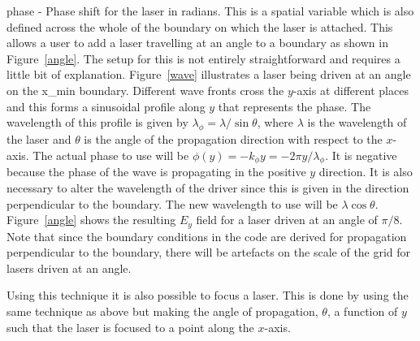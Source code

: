 {\emphtext phase} - Phase shift for the laser in radians. This is a spatial
variable which is also defined across the whole of the boundary on which the
laser is attached. This allows a user to add a laser travelling at an angle
to a boundary as shown in Figure~\ref{angle}.
The setup for this is not entirely straightforward and requires a little
bit of explanation. Figure~\ref{wave} illustrates a laser being driven at
an angle on the x\_min boundary. Different wave fronts cross the $y$-axis
at different places and this forms a sinusoidal profile along $y$ that
represents the phase. The wavelength of this profile is
given by $\lambda_\phi = \lambda / \sin\theta$, where $\lambda$ is the
wavelength of the laser and $\theta$ is the angle of the propagation
direction with respect to the $x$-axis. The actual phase to use will
be $\phi(y) = -k_\phi y = -2\pi y / \lambda_\phi$. It is negative because
the phase of the wave is propagating in the positive $y$ direction.
It is also necessary to alter the wavelength of the driver since this
is given in the direction perpendicular to the boundary. The new
wavelength to use will be $\lambda\cos\theta$. Figure~\ref{angle} shows
the resulting $E_y$ field for a laser driven at an angle of $\pi / 8$. Note
that since the boundary conditions in the code are derived for propagation
perpendicular to the boundary, there will be artefacts on the scale of the
grid for lasers driven at an angle.

Using this technique it is also possible to focus a laser. This is done by
using the same technique as above but making the angle of propagation,
$\theta$, a function of $y$ such that the laser is focused to a point along
the $x$-axis.



